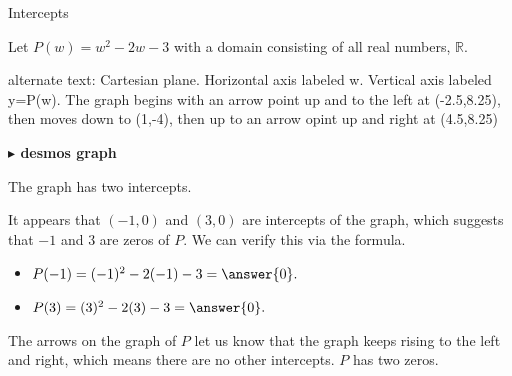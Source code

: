 \documentclass{ximera}
\begin{document}
\begin{example} Intercepts

Let $P(w) = w^2 - 2w - 3$ with a domain consisting of all real numbers, $\mathbb{R}$.






\begin{image}
\end{image}



\textcolor{gray!90}{alternate text: Cartesian plane. Horizontal axis labeled w. Vertical axis labeled y=P(w).  The graph begins with an arrow point up and to the left at (-2.5,8.25), then moves down to (1,-4), then up to an arrow opint up and right at (4.5,8.25)}

\begin{onlineOnly}
\textbf{\textcolor{blue!55!black}{$\blacktriangleright$ desmos graph}} 
\begin{center}
\end{center}
\end{onlineOnly}





The graph has two intercepts.

It appears that $(-1,0)$ and $(3,0)$ are intercepts of the graph, which suggests that $-1$ and $3$ are zeros of $P$.  We can verify this via the formula.


\begin{itemize}
\item $P(-1) = (-1)^2 -2(-1) - 3 = \answer{0}.$
\item $P(3) = (3)^2 -2(3) - 3 = \answer{0}.$
\end{itemize}


The arrows on the graph of $P$ let us know that the graph keeps rising to the left and right, which means there are no other intercepts. $P$ has two zeros.


\end{example}
\end{document}
